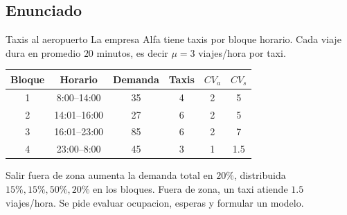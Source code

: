 \subsection{Enunciado}

\begin{enunciado}{Taxis al aeropuerto}
La empresa Alfa tiene taxis por bloque horario. Cada viaje dura en promedio \(20\) minutos, es decir \(\mu=3\) viajes/hora por taxi.

\begin{center}
\begin{tabular}{cccccc}
\toprule
Bloque & Horario & Demanda & Taxis & \(CV_a\) & \(CV_s\) \\
\midrule
1 & 8:00--14:00 & 35 & 4 & 2 & 5 \\
2 & 14:01--16:00 & 27 & 6 & 2 & 5 \\
3 & 16:01--23:00 & 85 & 6 & 2 & 7 \\
4 & 23:00--8:00 & 45 & 3 & 1 & 1.5 \\
\bottomrule
\end{tabular}
\end{center}

Salir fuera de zona aumenta la demanda total en \(20\%\), distribuida \(15\%,15\%,50\%,20\%\) en los bloques. Fuera de zona, un taxi atiende \(1.5\) viajes/hora. Se pide evaluar ocupacion, esperas y formular un modelo.
\end{enunciado}
